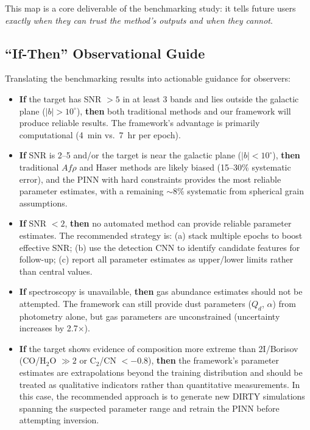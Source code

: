\documentclass[preprint2]{aastex631}
\begin{document}
This map is a core deliverable of the benchmarking study: it tells future users \textit{exactly when they can trust the method's outputs and when they cannot}.

\subsection{``If-Then'' Observational Guide}\label{sec:ifthen}

Translating the benchmarking results into actionable guidance for observers:

\begin{itemize}
    \item \textbf{If} the target has SNR $>5$ in at least 3 bands and lies outside the galactic plane ($|b| > 10^\circ$), \textbf{then} both traditional methods and our framework will produce reliable results. The framework's advantage is primarily computational (4~min vs.\ 7~hr per epoch).

    \item \textbf{If} SNR is 2--5 and/or the target is near the galactic plane ($|b| < 10^\circ$), \textbf{then} traditional $Af\rho$ and Haser methods are likely biased (15--30\% systematic error), and the PINN with hard constraints provides the most reliable parameter estimates, with a remaining $\sim$8\% systematic from spherical grain assumptions.

    \item \textbf{If} SNR $<2$, \textbf{then} no automated method can provide reliable parameter estimates. The recommended strategy is: (a) stack multiple epochs to boost effective SNR; (b) use the detection CNN to identify candidate features for follow-up; (c) report all parameter estimates as upper/lower limits rather than central values.

    \item \textbf{If} spectroscopy is unavailable, \textbf{then} gas abundance estimates should not be attempted. The framework can still provide dust parameters ($Q_d$, $\alpha$) from photometry alone, but gas parameters are unconstrained (uncertainty increases by 2.7$\times$).

    \item \textbf{If} the target shows evidence of composition more extreme than 2I/Borisov (CO/H$_2$O $\gg 2$ or C$_2$/CN $<-0.8$), \textbf{then} the framework's parameter estimates are extrapolations beyond the training distribution and should be treated as qualitative indicators rather than quantitative measurements. In this case, the recommended approach is to generate new DIRTY simulations spanning the suspected parameter range and retrain the PINN before attempting inversion.
\end{itemize}
\end{document}

